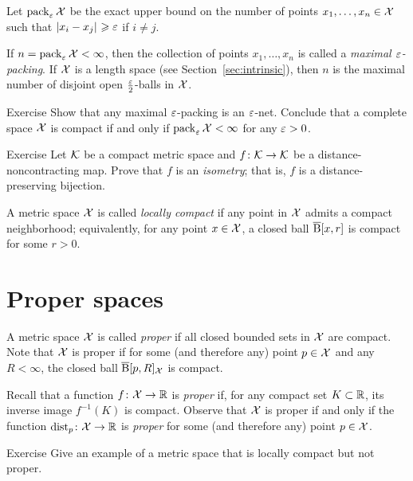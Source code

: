 Let $\operatorname{\rm pack}\nolimits_\varepsilon\mathcal{X}$ be the exact upper bound on the number of points $x_1,\z\dots,x_n\in \spc{X}$ such that $\dist{x_i}{x_j}{}\ge\eps$ if $i\ne j$.

If $n=\operatorname{\rm pack}\nolimits_\varepsilon\mathcal{X}<\infty$, then
the collection of points $x_1,\dots,x_n$ is called a \emph{maximal $\varepsilon$-packing}.
If $\mathcal{X}$ is a length space (see Section~\ref{sec:intrinsic}), then $n$ is the maximal number of disjoint open $\tfrac{\varepsilon}2$-balls in $\mathcal{X}$.

\begin{thm}{Exercise}\label{ex:pack-net}
Show that any maximal $\varepsilon$-packing is an $\varepsilon$-net.
Conclude that a complete space $\mathcal{X}$ is compact if and only if $\pack_\eps\spc{X}\z<\infty$ for any $\varepsilon>0$.
\end{thm}


\begin{thm}{Exercise}\label{ex:non-contracting-map}
Let $\mathcal{K}$  be a compact metric space and
$f\:\spc{K}\z\to \spc{K}$
be a distance-noncontracting map.
Prove that $f$ is an \emph{isometry};
that is, $f$ is a distance-preserving bijection.
\end{thm}

A metric space $\mathcal{X}$ is called \emph{locally compact} if any point in $\mathcal{X}$ admits a compact neighborhood;
equivalently, for any point $x\in\mathcal{X}$, a closed ball $\overline{\mathrm{B}}{}[x,r]$ is compact for some $r>0$.

\section{Proper spaces}



A metric space $\mathcal{X}$ is called \emph{proper} if all closed bounded sets in $\mathcal{X}$ are compact.
Note that $\mathcal{X}$ is proper if for some (and therefore any) point $p\in \mathcal{X}$ and any $R<\infty$, 
the closed ball $\overline{\mathrm{B}}{}[p,R]_{\mathcal{X}}$ is compact.

Recall that a function $f\colon\mathcal{X}\to\mathbb{R}$ is \emph{proper} if, for any compact set $K\subset \mathbb{R}$, its inverse image $f^{-1}(K)$ is compact.
Observe that $\mathcal{X}$ is proper if and only if the function $\mathrm{dist}_p\colon\mathcal{X}\to\mathbb{R}$ is \emph{proper} for some (and therefore any) point $p\in \mathcal{X}$.

\begin{thm}{Exercise}\label{ex:loc-compact-not-proper}
Give an example of a metric space that is locally compact but not proper.
\end{thm}

